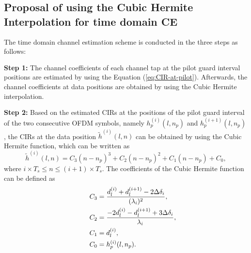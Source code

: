 \documentclass[12pt,journal,draftclsnofoot,onecolumn]{IEEEtran}
\begin{document}
	
\subsection{Proposal of using the Cubic Hermite Interpolation for time domain CE}
	
The time domain  channel estimation scheme  is conducted in the three steps as follows:
	
\rm{\textbf {Step 1:} The channel coefficients of each channel tap at the pilot guard interval positions are estimated by using the Equation (\ref{eq:CIR-at-pilot}). Afterwards, the channel coefficients at data positions are obtained by using the Cubic Hermite interpolation. 
		
		
\rm{\textbf {Step 2:} Based on the estimated CIRs at the positions of the pilot guard interval of the two consecutive OFDM symbols, namely $h^{(i)}_{p}(l,n_p)$ and $h^{(i+1)}_{p}(l,n_p)$,  the CIRs at the data position $\tilde h^{(i)}(l,n)$  can be obtained  by using the Cubic Hermite function, which can be written as 
%
\begin{equation}\label{eq:cubic-hermite}
			\tilde h^{(i)}(l,n) = C_3(n - n_{p})^3 + C_2(n - n_{p})^2 + C_1(n-n_{p}) + C_0,
\end{equation}
%
where $i\times T_{s}\leq n\leq (i+1)\times T_{s}$. The coefficients of the Cubic Hermite function can be defined as
\begin{align*}
			\centering
			C_3 &= \frac{d^{(i)}_{l}+d^{(i+1)}_{l}-2{\Delta {\delta _i}}}{(\lambda_{i})^2},\\
			C_2 &= \dfrac{-2d^{(i)}_{l}-d^{(i+1)}_{l}+3{\Delta {\delta _i}}}{\lambda_{i}},\\
			\qquad C_1 &=d^{(i)}_{l},\\
			C_0 &= h^{(i)}_{p}(l,n_p).
\end{align*}	
%
			
}}
\end{document}
